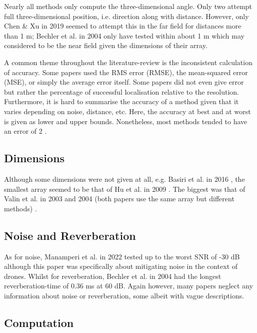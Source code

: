 \documentclass{report}
\begin{document}
Nearly all methods only compute the three-dimensional angle. Only two attempt full three-dimensional position, i.e. direction along with distance. However, only Chen \& Xu in 2019 \cite{chen_sound_2019} seemed to attempt this in the far field for distances more than 1 \si{m}; Bechler et al. in 2004 \cite{bechler_system_2004} only have tested within about 1 \si{m} which may considered to be the near field given the dimensions of their array.

A common theme throughout the literature-review is the inconsistent calculation of accuracy. Some papers used the RMS error (RMSE), the mean-squared error (MSE), or simply the average error itself. Some papers did not even give error but rather the percentage of successful localisation relative to the resolution. Furthermore, it is hard to summarise the accuracy of a method given that it varies depending on noise, distance, etc. Here, the accuracy at best and at worst is given as lower and upper bounds. Nonetheless, most methods tended to have an error of 2 \si{\deg}.

\subsection{Dimensions}

Although some dimensions were not given at all, e.g. Basiri et al. in 2016 \cite{basiri_-board_2016}, the smallest array seemed to be that of Hu et al. in 2009 \cite{hu_estimation_2009}. The biggest was that of Valin et al. in 2003 and 2004 (both papers use the same array but different methods) \cite{valin_robust_2003} \cite{valin_localization_2004}.

\subsection{Noise and Reverberation}

As for noise, Manamperi et al. in 2022 \cite{manamperi_drone_2022} tested up to the worst SNR of -30 \si{dB} although this paper was specifically about mitigating noise in the context of drones. Whilst for reverberation, Bechler et al. in 2004 \cite{bechler_system_2004} had the longest reverberation-time of 0.36 \si{ms} at 60 \si{dB}. Again however, many papers neglect any information about noise or reverberation, some albeit with vague descriptions.

\subsection{Computation}
\end{document}
